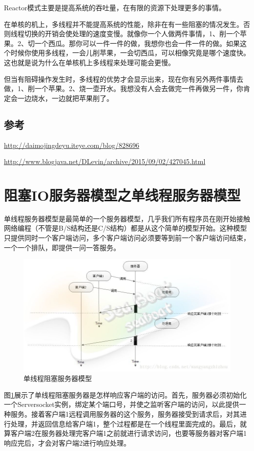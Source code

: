 \documentclass[UTF8,a4paper,8pt]{ctexbook}
\begin{document}
			Reactor模式主要是提高系统的吞吐量，在有限的资源下处理更多的事情。
			
			在单核的机上，多线程并不能提高系统的性能，除非在有一些阻塞的情况发生。否则线程切换的开销会使处理的速度变慢。就像你一个人做两件事情，1、削一个苹果。2、切一个西瓜。那你可以一件一件的做，我想你也会一件一件的做。如果这个时候你使用多线程，一会儿削苹果，一会切西瓜，可以相像究竟是哪个速度快。这也就是说为什么在单核机上多线程来处理可能会更慢。
			
			但当有阻碍操作发生时，多线程的优势才会显示出来，现在你有另外两件事情去做，1、削一个苹果。2、烧一壶开水。我想没有人会去做完一件再做另一件，你肯定会一边烧水，一边就把苹果削了。
		
	\subsection{参考}
	\url{http://daimojingdeyu.iteye.com/blog/828696}
	
	\url{http://www.blogjava.net/DLevin/archive/2015/09/02/427045.html}	
	
	\section{阻塞IO服务器模型之单线程服务器模型}
		单线程服务器模型是最简单的一个服务器模型，几乎我们所有程序员在刚开始接触网络编程（不管是B/S结构还是C/S结构）都是从这个简单的模型开始。这种模型只提供同时一个客户端访问，多个客户端访问必须要等到前一个客户端访问结束，一个一个排队，即提供一问一答服务。
		\begin{figure}[h]
			\centering
			\includegraphics[scale = 1.6]{IO_SingleThread_Blocking.jpg}
			\caption{单线程阻塞服务器模型}
			\label{Blocking_Single}
		\end{figure}
	
		图\ref{Blocking_Single}展示了单线程阻塞服务器是怎样响应客户端的访问。首先，服务器必须初始化一个Serversocket实例，绑定某个端口号，并使之监听客户端的访问，以此提供一种服务。接着客户端1远程调用服务器的这个服务，服务器接受到请求后，对其进行处理，并返回信息给客户端1，整个过程都是在一个线程里面完成的。最后，就算客户端2在服务器处理完客户端1之前就进行请求访问，也要等服务器对客户端1响应完后，才会对客户端2进行响应处理。
		
\end{document}
